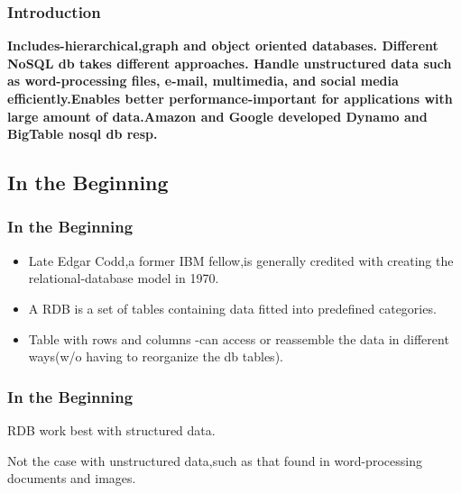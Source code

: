 \documentclass{beamer}
\begin{document}
\begin{frame}\frametitle{Introduction}
\begin{itemize}
\begin{center}
\textbf{Includes-hierarchical,graph and object oriented databases. \newline \newline Different NoSQL db takes different approaches. \newline\newline  Handle unstructured data such as word-processing files, e-mail, multimedia, and social media efficiently.\newline\newline Enables better performance-important for applications with large amount of data.\newline\newline Amazon and Google developed Dynamo and BigTable nosql db resp. }
\end{center}
\end{itemize}
\end{frame}

\subsection[]{In the Beginning}
\begin{frame}\frametitle{In the Beginning}
\vspace{0.5cm}
\begin{itemize}
\item Late Edgar Codd,a former IBM fellow,is generally credited with creating the relational-database model in 1970.\vspace{0.5cm}
\item A RDB is a set of tables containing data fitted into predefined categories.\vspace{0.5cm}  
\item Table with rows and columns -can access or reassemble the data in different ways(w/o having to reorganize the db tables).
\\
\end{itemize}
\end{frame}
\begin{frame}\frametitle{In the Beginning}
\item RDB work best with structured data.\vspace{0.5cm}
\item Not the case with unstructured data,such as that found in word-processing documents and images.\vspace{0.5cm}
\end{frame}
\end{document}
